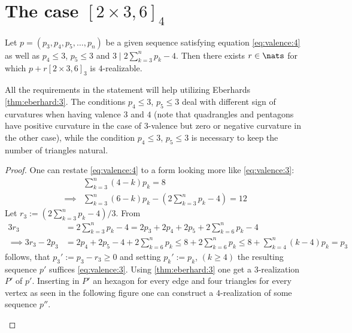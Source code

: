 \section{The case $[2 \times 3, 6]_4$}
\begin{lemma}
  Let $p = (p_3, p_4, p_5, \dots, p_n)$ be a given sequence satisfying equation \ref{eq:valence:4} as well as $p_4 \leq 3$, $p_5 \leq 3$ and $3 \mid 2 \sum_{k=3}^{n} p_k - 4$. Then there exists $r \in \nats$ for which $p + r [2 \times 3, 6]_3$ is $4$-realizable.

  All the requirements in the statement will help utilizing Eberhards \ref{thm:eberhard:3}. The conditions $p_4 \leq 3$, $p_5 \leq 3$ deal with different sign of curvatures when having valence $3$ and $4$ (note that quadrangles and pentagons have positive curvature in the case of $3$-valence but zero or negative curvature in the other case), while the condition $p_4 \leq 3$, $p_5 \leq 3$ is necessary to keep the number of triangles natural. 
  \begin{proof}
    One can restate \ref{eq:valence:4} to a form looking more like \ref{eq:valence:3}:
    \begin{align*}
      & \sum_{k=3}^n \left( 4 - k \right) p_k = 8 \\
      \implies & \sum_{k=3}^n \left( 6 - k \right) p_k - \left(2 \sum_{k=3}^n  p_k - 4 \right) = 12
    \end{align*}
    Let $r_3 := (2 \sum_{k=3}^{n} p_k - 4)/3$. From
    \begin{align*}
      3 r_3 &= 2 \sum_{k=3}^{n} p_k - 4 =  2 p_3 + 2 p_4 + 2 p_5 + 2 \sum_{k=6}^{n} p_k - 4\\
      \implies 3 r_3 - 2 p_3 &= 2 p_4 + 2 p_5 - 4 + 2 \sum_{k=6}^{n} p_k \leq 8 + 2 \sum_{k=6}^{n} p_k \leq 8 + \sum_{k=4}^{n} (k - 4) p_k = p_3
    \end{align*}
    follows, that $p_3' := p_3 - r_3 \geq 0$ and setting $p_k' := p_k$, $(k \geq 4)$ the resulting sequence $p'$ suffices \ref{eq:valence:3}. Using \ref{thm:eberhard:3} one get a $3$-realization $P'$ of $p'$. Inserting in $P'$ an hexagon for every edge and four triangles for every vertex as seen in the following figure one can construct a $4$-realization of some sequence $p''$.
    \begin{figure}[htpp]
      \centering
\end{figure}
\end{proof}
\end{lemma}
